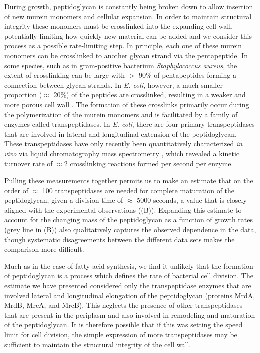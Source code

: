 During growth, peptidoglycan is constantly being broken down to allow insertion
of new murein monomers and cellular expansion. In order to maintain structural
integrity these monomers must be crosslinked into the expanding cell wall,
potentially limiting how quickly new material can be added and we consider this
process as a possible rate-limiting step. In principle,  each one of these
murein monomers can be crosslinked to another glycan strand via the
pentapeptide.  In some species, such as in gram-positive bacterium
\textit{Staphylococcus aureus}, the extent of crosslinking can be large with $>$
90\% of pentapeptides forming a connection between glycan strands. In \textit{E.
coli}, however, a much smaller proportion ($\approx$ 20\%) of the peptides are
crosslinked, resulting in a weaker and more porous cell wall \cite{vollmer2008a,
rogers1980}.  The formation of these crosslinks primarily occur during the
polymerization of the murein monomers and is facilitated by a family of enzymes
called transpeptidases. In \textit{E. coli}, there are four primary
transpeptidases that are involved in lateral and longitudinal extension of the
peptidoglycan. These transpeptidases have only recently been quantitatively
characterized \textit{in vivo} via liquid chromatography mass spectrometry
\citep{catherwood2020}, which revealed a kinetic turnover rate of $\approx
2$ crosslinking reactions formed per second per enzyme.

Pulling these measurements together permits us to make an estimate that on the
order of $\approx$ 100 transpeptidases are needed for complete maturation of the
peptidoglycan, given a division time of $\approx$ 5000 seconds, a value that is
closely aligned with the experimental observations ((B)). Expanding this
estimate to account for the changing mass of the peptidoglycan as a function
of growth rates (grey line in (B)) also qualitatively captures the observed
dependence in the data, though systematic disagreements between the different
data sets makes the comparison more difficult.

Much as in the case of fatty acid synthesis, we find it unlikely that the
formation of peptidoglycan is a process which defines the rate of bacterial cell division.
The estimate we have presented considered only the transpeptidase enzymes that
are involved lateral and longitudinal elongation of the peptidoglycan (proteins
MrdA, MrdB, MrcA, and MrcB). This neglects the presence of other transpeptidases
that are present in the periplasm and also involved in remodeling and maturation
of the peptidoglycan. It is therefore possible that if this was setting the
speed limit for cell division, the simple expression of more
transpeptidases may be sufficient to maintain the structural integrity of the
cell wall.
